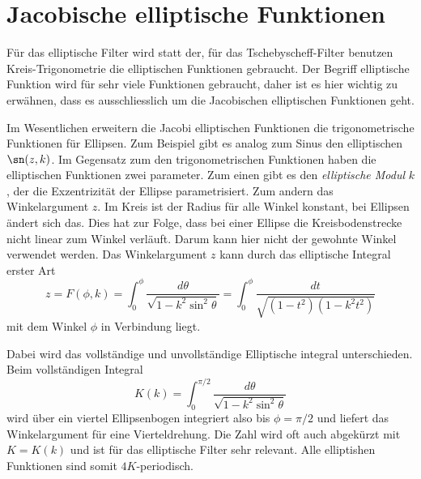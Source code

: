 \section{Jacobische elliptische Funktionen}


Für das elliptische Filter wird statt der, für das Tschebyscheff-Filter benutzen Kreis-Trigonometrie die elliptischen Funktionen gebraucht.
Der Begriff elliptische Funktion wird für sehr viele Funktionen gebraucht, daher ist es hier wichtig zu erwähnen, dass es ausschliesslich um die Jacobischen elliptischen Funktionen geht.

Im Wesentlichen erweitern die Jacobi elliptischen Funktionen die trigonometrische Funktionen für Ellipsen.
Zum Beispiel gibt es analog zum Sinus den elliptischen $\sn(z, k)$.
Im Gegensatz zum den trigonometrischen Funktionen haben die elliptischen Funktionen zwei parameter.
Zum einen gibt es den \textit{elliptische Modul} $k$, der die Exzentrizität der Ellipse parametrisiert.
Zum andern das Winkelargument $z$.
Im Kreis ist der Radius für alle Winkel konstant, bei Ellipsen ändert sich das.
Dies hat zur Folge, dass bei einer Ellipse die Kreisbodenstrecke nicht linear zum Winkel verläuft.
Darum kann hier nicht der gewohnte Winkel verwendet werden.
Das Winkelargument $z$ kann durch das elliptische Integral erster Art
\begin{equation}
    z
    =
    F(\phi, k)
    =
    \int_{0}^{\phi}
    \frac{
        d\theta
    }{
        \sqrt{
            1-k^2 \sin^2 \theta
        }
    }
    =
    \int_{0}^{\phi}
    \frac{
        dt
    }{
        \sqrt{
            (1-t^2)(1-k^2 t^2)
        }
    } %
\end{equation}
mit dem Winkel $\phi$ in Verbindung liegt.

Dabei wird das vollständige und unvollständige Elliptische integral unterschieden.
Beim vollständigen Integral
\begin{equation}
    K(k)
    =
    \int_{0}^{\pi / 2}
    \frac{
        d\theta
    }{
        \sqrt{
            1-k^2 \sin^2 \theta
        }
    }
\end{equation}
wird über ein viertel Ellipsenbogen integriert also bis $\phi=\pi/2$ und liefert das Winkelargument für eine Vierteldrehung.
Die Zahl wird oft auch abgekürzt mit $K = K(k)$ und ist für das elliptische Filter sehr relevant.
Alle elliptishen Funktionen sind somit $4K$-periodisch.

